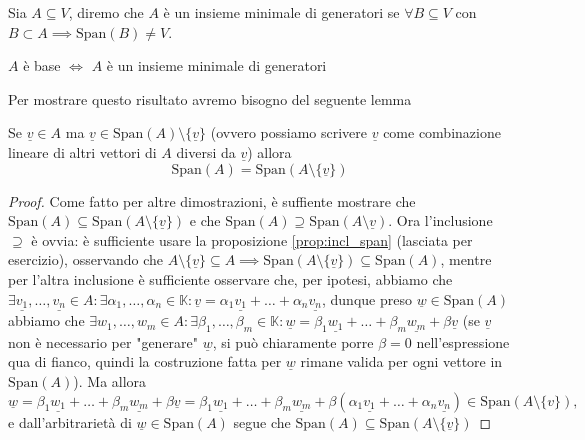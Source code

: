 \begin{definition}
    Sia $A \subseteq V$, diremo che $A$ è un insieme minimale di generatori se $\forall B \subseteq V$ con $B \subset A \implies \text{Span}(B) \neq V$.
\end{definition}
\begin{lemma}
    $A$ è base $\iff$ $A$ è un insieme minimale di generatori
    \label{lemma:min_generatori}
\end{lemma}
Per mostrare questo risultato avremo bisogno del seguente lemma
\begin{lemma}
    Se $\underline{v} \in A$ ma $\underline{v} \in \text{Span}(A) \setminus \{ \underline{v} \}$ (ovvero possiamo scrivere $\underline{v}$ come combinazione lineare di altri vettori di $A$ diversi da $\underline{v}$) allora
    $$
        \text{Span}(A) = \text{Span}(A \setminus \{ \underline{v} \})
    $$
    \label{lemma:rim_superf}
\end{lemma}
\begin{proof}
    Come fatto per altre dimostrazioni, è suffiente mostrare che $\text{Span}(A) \subseteq \text{Span}(A \setminus \{\underline{v}\})$ e che $\text{Span}(A) \supseteq \text{Span}(A \setminus \underline{v})$. Ora l'inclusione $\boxed{\supseteq}$ è ovvia: è sufficiente usare la proposizione \ref{prop:incl_span} (lasciata per esercizio), osservando che $A \setminus \{ \underline{v} \} \subseteq A \implies \text{Span}(A \setminus \{ \underline{v} \}) \subseteq \text{Span}(A)$, mentre
    per l'altra inclusione è sufficiente osservare che, per ipotesi, abbiamo che $\exists \underline{v_1}, \ldots, \underline{v_n} \in A : \exists \alpha_1, \ldots, \alpha_n \in \mathbb{K} : \underline{v} = \alpha_1 \underline{v_1} + \ldots + \alpha_n \underline{v_n}$, dunque preso $\underline{w} \in \text{Span}(A)$ abbiamo che $\exists w_1, \ldots, w_m \in A : \exists \beta_1, \ldots, \beta_m \in \mathbb{K} : \underline{w} = \beta_1 \underline{w_1} + \ldots + \beta_m \underline{w_m} + \beta \underline{v}$ (se $\underline{v}$ non è necessario per "generare" $\underline{w}$, si può chiaramente porre $\beta = 0$ nell'espressione qua di fianco, quindi la costruzione fatta per $\underline{w}$ rimane valida per ogni vettore in $\text{Span}(A)$). Ma allora
    $$
        \underline{w} = \beta_1 \underline{w_1} + \ldots + \beta_m \underline{w_m} + \beta \underline{v} = \beta_1 \underline{w_1} + \ldots + \beta_m \underline{w_m} + \beta (\alpha_1 \underline{v_1} + \ldots + \alpha_n \underline{v_n}) \in \text{Span}(A \setminus \{ v \}),
    $$
    e dall'arbitrarietà di $\underline{w} \in \text{Span}(A)$ segue che $\text{Span}(A) \subseteq \text{Span}(A \setminus \{ \underline{v} \})$
\end{proof}
